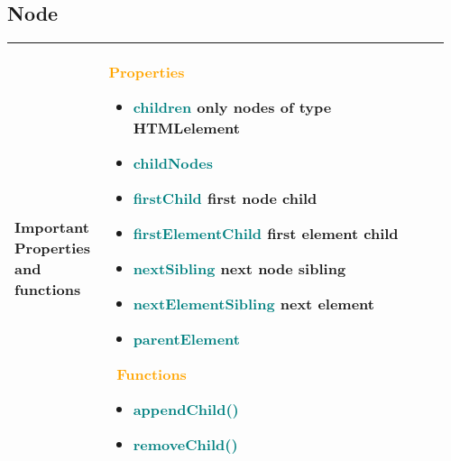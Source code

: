 \documentclass[main.tex,fontsize=8pt,paper=a4,paper=portrait,DIV=calc,]{scrartcl}
\begin{document}
\begin{table}[!ht]
\subsection{Node}
\begin{tabular}{|m{0.2\linewidth}|m{0.755\linewidth}|}
\hline
Important Properties and functions & 
\textcolor{orange}{\textbf{Properties}}
\begin{itemize}
  \item \textcolor{teal}{children} only nodes of type HTMLelement 
  \item \textcolor{teal}{childNodes} 
  \item \textcolor{teal}{firstChild} first node child
  \item \textcolor{teal}{firstElementChild} first element child
  \item \textcolor{teal}{nextSibling} next node sibling
  \item \textcolor{teal}{nextElementSibling} next element 
  \item \textcolor{teal}{parentElement} 
\end{itemize}
\, \newline
\textcolor{orange}{Functions}\newline
\begin{itemize}
  \item \textcolor{teal}{appendChild()}
  \item \textcolor{teal}{removeChild()}
  \vspace{-3mm}
\end{itemize}\\
\hline
\end{tabular}

\end{table}
\end{document}
